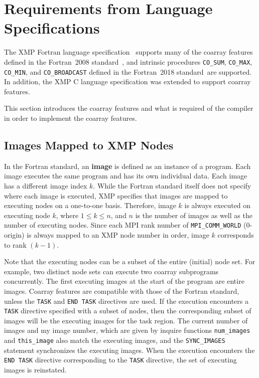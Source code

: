 ﻿\section{Requirements from Language Specifications}\label{sec:spec}

The XMP Fortran language specification~\cite{xmp} supports many of 
the coarray features defined in the Fortran~2008 standard~\cite{coarray}, 
and intrinsic procedures {\tt CO\_SUM}, {\tt CO\_MAX}, {\tt CO\_MIN}, and 
{\tt CO\_BROADCAST} defined in the Fortran~2018 standard~\cite{coarray18}are supported.
In addition, the XMP C language specification was extended to support coarray features.

This section introduces the coarray features and what is required
of the compiler in order to implement the coarray features.


\subsection{Images Mapped to XMP Nodes}\label{sec:spec-image}

In the Fortran standard, an {\bf image} is defined as an instance of a program. 
Each image executes the same program and has its own individual data.
Each image has a different image index $k$.
While the Fortran standard itself does not specify where each image is executed, 
XMP specifies that images are mapped to executing nodes on a one-to-one basis.
Therefore, image $k$ is always executed on executing node $k$, where $1 \leq k \leq n$, and 
$n$ is the number of images as well as the number of executing nodes. 
Since each MPI rank number of {\tt MPI\_COMM\_WORLD} (0-origin) is 
always mapped to an XMP node number in order, image $k$ corresponds to 
rank $(k - 1)$.

Note that the executing nodes can be a subset of the entire (initial) node set. 
For example, two distinct node sets can execute two coarray subprograms concurrently.
The first executing images at the start of the program are entire images.
Coarray features are compatible with those of the Fortran standard, unless 
the {\tt TASK} and {\tt END TASK} directives are used.
If the execution encounters a {\tt TASK} directive specified with a subset of nodes, 
then the corresponding subset of images will be the executing images for the task region. 
The current number of images and my image number,  which are given by inquire functions
{\tt num\_images} and {\tt this\_image} also match the executing images, and
the {\tt SYNC\_IMAGES} statement synchronizes the executing images.
When the execution encounters the {\tt END TASK} directive corresponding to the
{\tt TASK} directive, the set of executing images is reinstated.


